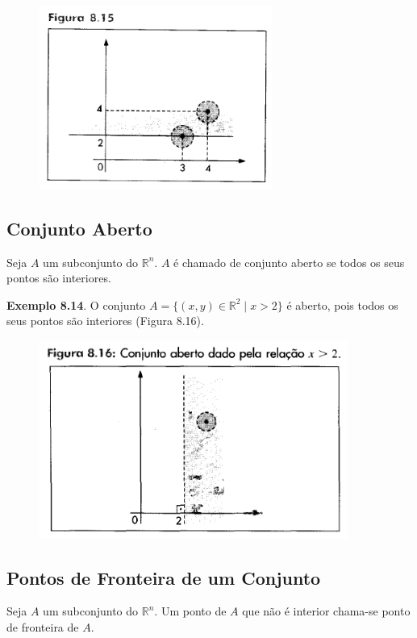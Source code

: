 		\begin{figure}[H]
			\includegraphics[height=6cm]{images/morettin_figura-8-15}
		\end{figure}
		
	\subsection{Conjunto Aberto \cite{morettin}}

		Seja $A$ um subconjunto do $\mathbb{R}^{n}$. $A$ é chamado de conjunto aberto se todos os seus pontos são interiores.

		\textbf{Exemplo 8.14}. O conjunto $A = \{(x, y) \in \mathbb{R}^2 \mid x > 2\}$ é aberto, pois todos os seus pontos são interiores (Figura 8.16).

		\begin{figure}[H]
			\includegraphics[height=6.5cm]{images/morettin_figura-8-16}
		\end{figure}

	\subsection{Pontos de Fronteira de um Conjunto \cite{morettin}}

		Seja $A$ um subconjunto do $\mathbb{R}^{n}$. Um ponto de $A$ que não é interior chama-se ponto de fronteira de $A$.

